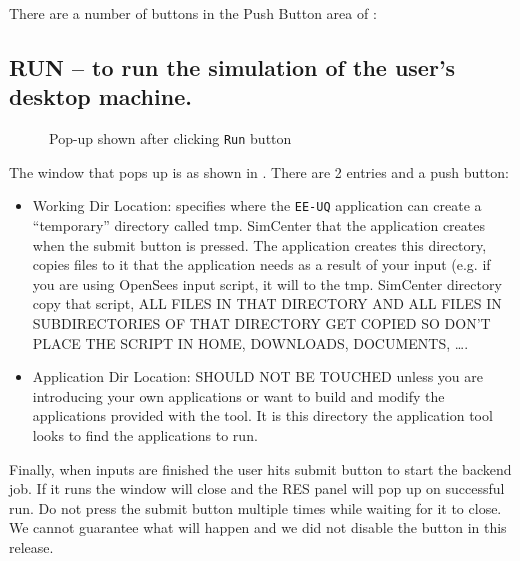 There are a number of buttons in the Push Button area of :

\subsection{RUN – to run the simulation of the user’s desktop machine.}
\begin{figure}[!htbp]
  \caption{Pop-up shown after clicking \texttt{Run} button}
  \label{fig:figure15}
\end{figure}

The window that pops up is as shown in . There
are 2 entries and a push button:

\begin{itemize}
\item Working Dir Location: specifies where the \texttt{EE-UQ} application can create a “temporary” directory called tmp. SimCenter that the application 
creates when the submit button is pressed. The application creates
this directory, copies files to it that the application needs as a
result of your input (e.g. if you are using OpenSees input script, it
will to the tmp. SimCenter directory copy that script, ALL FILES IN
THAT DIRECTORY AND ALL FILES IN SUBDIRECTORIES OF THAT DIRECTORY GET
COPIED SO DON’T PLACE THE SCRIPT IN HOME, DOWNLOADS, DOCUMENTS, ….
\item Application Dir Location: SHOULD NOT BE TOUCHED unless you are introducing your own applications or want to build and modify the 
applications provided with the tool. It is this directory the
application tool looks to find the applications to run.
\end{itemize}


Finally, when inputs are finished the user hits submit button to start
the backend job. If it runs the window will close and the RES panel
will pop up on successful run. Do not press the submit button multiple
times while waiting for it to close. We cannot guarantee what will
happen and we did not disable the button in this release.

